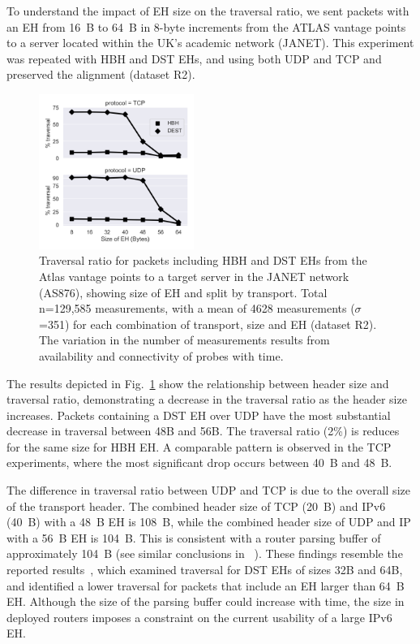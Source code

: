 \documentclass[conference]{IEEEtran}
\begin{document}
To understand the impact of EH size on the traversal ratio, we sent packets
 with an EH from 16~B to 64~B in 8-byte
increments from the ATLAS
vantage points to a server located within the UK's academic network
(JANET).  This experiment was repeated with
HBH and DST EHs, and using both UDP and TCP and preserved the alignment (dataset R2).


\begin{figure}[t]
\centering
  \includegraphics[width=0.45\textwidth]{sizes.png}
  \caption{Traversal ratio for packets including HBH and DST EHs from the Atlas
vantage points to a target server in the JANET network (AS876), showing
size of EH and split by transport.  Total n=129,585 measurements, with a mean
of 4628 measurements ($\sigma$=351) for each combination of transport, size and
EH (dataset R2). The variation in the number of measurements results from
availability and connectivity of  probes with time.  }

  \label{fig:sizes}
\end{figure}
 

The results depicted in Fig.~\ref{fig:sizes} show the relationship between
header size and traversal ratio, demonstrating a decrease in the traversal ratio
as the header size increases.  Packets containing a DST EH over UDP have the
most substantial decrease in traversal between 48B and 56B. The 
traversal ratio (2\%) is reduces for the same size for HBH EH. A
comparable pattern is observed in the TCP experiments, where the most significant
drop occurs between 40~B and 48~B.


The difference in traversal ratio between UDP and TCP is due to the overall
size of the transport header.  The combined header size of TCP (20~B) and IPv6
(40~B) with a 48~B EH is 108~B, while the combined header size of UDP and IP
with a 56~B EH is 104~B. This is consistent with a router parsing buffer of approximately 104~B
(see similar conclusions in ~\cite{james-imc}). These findings
resemble the reported results~\cite{james-imc}, which examined traversal
 for DST EHs of sizes 32B and 64B, and identified a lower traversal for
packets that include an EH larger than 64~B EH.
Although the size of the parsing buffer could increase with time, the size in deployed routers imposes a
constraint on the current usability of a large IPv6 EH.
\end{document}
